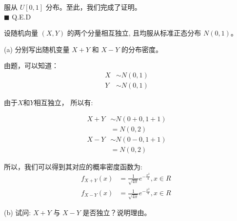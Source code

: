 \documentclass[a4,10pt]{ctexart}
\begin{document}
服从 \(U[0,1]\) 分布。至此，我们完成了证明。\\

\(\blacksquare\) Q.E.D 

    
    \begin{ti}{3}{}

    设随机向量 $(X, Y)$ 的两个分量相互独立, 且均服从标准正态分布 $N(0,1)$。
    
    (a) 分别写出随机变量 $X+Y$ 和 $X-Y$ 的分布密度。

\end{ti}

\begin{qj}
由题，可以知道：
\begin{align}
    X &\sim N(0,1) \\
    Y &\sim N(0,1)
\end{align}

由于$X$和$Y$相互独立， 所以有:

\begin{align}
    X+Y &\sim N(0+0, 1+1) \\
    &= N(0,2)\\
    X-Y &\sim N(0-0, 1+1) \\
    &= N(0,2)
\end{align}

所以，我们可以得到其对应的概率密度函数为:
\begin{align}
    f_{X+Y}(x) &= \frac{1}{\sqrt{4\pi}} e^{-\frac{x^2}{4}}, x \in R\\
    f_{X-Y}(x) &= \frac{1}{\sqrt{4\pi}} e^{-\frac{x^2}{4}},x \in R\
\end{align}


\end{qj}


    (b) 试问: $X+Y$ 与 $X-Y$ 是否独立？说明理由。
    
\end{document}
